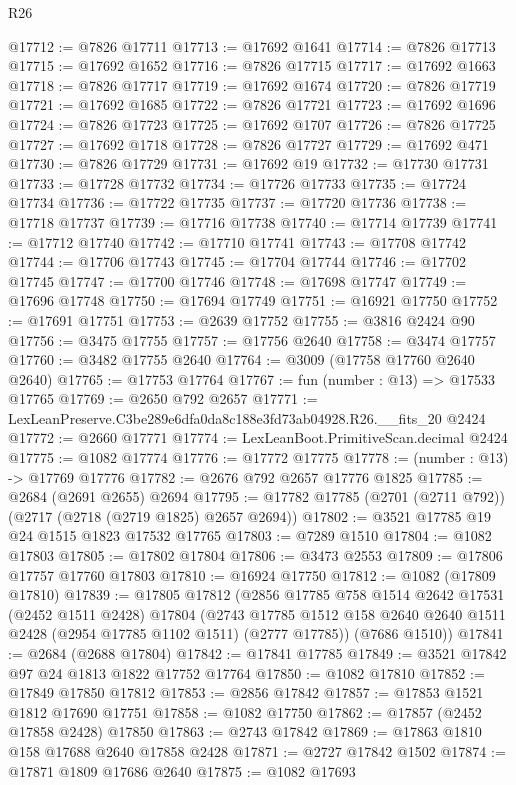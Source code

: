 \begin{lexlean}{R26}
\begin{coremodule}
@17712 := @7826 @17711
@17713 := @17692 @1641
@17714 := @7826 @17713
@17715 := @17692 @1652
@17716 := @7826 @17715
@17717 := @17692 @1663
@17718 := @7826 @17717
@17719 := @17692 @1674
@17720 := @7826 @17719
@17721 := @17692 @1685
@17722 := @7826 @17721
@17723 := @17692 @1696
@17724 := @7826 @17723
@17725 := @17692 @1707
@17726 := @7826 @17725
@17727 := @17692 @1718
@17728 := @7826 @17727
@17729 := @17692 @471
@17730 := @7826 @17729
@17731 := @17692 @19
@17732 := @17730 @17731
@17733 := @17728 @17732
@17734 := @17726 @17733
@17735 := @17724 @17734
@17736 := @17722 @17735
@17737 := @17720 @17736
@17738 := @17718 @17737
@17739 := @17716 @17738
@17740 := @17714 @17739
@17741 := @17712 @17740
@17742 := @17710 @17741
@17743 := @17708 @17742
@17744 := @17706 @17743
@17745 := @17704 @17744
@17746 := @17702 @17745
@17747 := @17700 @17746
@17748 := @17698 @17747
@17749 := @17696 @17748
@17750 := @17694 @17749
@17751 := @16921 @17750
@17752 := @17691 @17751
@17753 := @2639 @17752
@17755 := @3816 @2424 @90
@17756 := @3475 @17755
@17757 := @17756 @2640
@17758 := @3474 @17757
@17760 := @3482 @17755 @2640
@17764 := @3009 (@17758 @17760 @2640 @2640)
@17765 := @17753 @17764
@17767 := fun (number : @13) => @17533 @17765
@17769 := @2650 @792 @2657
@17771 := LexLeanPreserve.C3be289e6dfa0da8c188e3fd73ab04928.R26.__fits_20 @2424
@17772 := @2660 @17771
@17774 := LexLeanBoot.PrimitiveScan.decimal @2424
@17775 := @1082 @17774
@17776 := @17772 @17775
@17778 := (number : @13) -> @17769 @17776
@17782 := @2676 @792 @2657 @17776 @1825
@17785 := @2684 (@2691 @2655) @2694
@17795 := @17782 @17785 (@2701 (@2711 @792)) (@2717 (@2718 (@2719 @1825) @2657 @2694))
@17802 := @3521 @17785 @19 @24 @1515 @1823 @17532 @17765
@17803 := @7289 @1510
@17804 := @1082 @17803
@17805 := @17802 @17804
@17806 := @3473 @2553
@17809 := @17806 @17757 @17760 @17803
@17810 := @16924 @17750
@17812 := @1082 (@17809 @17810)
@17839 := @17805
    @17812
    (@2856
      @17785
      @758
      @1514
      @2642
      @17531
      (@2452 @1511 @2428)
      @17804
      (@2743 @17785 @1512 @158 @2640 @2640 @1511 @2428 (@2954 @17785 @1102 @1511) (@2777 @17785))
      (@7686 @1510))
@17841 := @2684 (@2688 @17804)
@17842 := @17841 @17785
@17849 := @3521 @17842 @97 @24 @1813 @1822 @17752 @17764
@17850 := @1082 @17810
@17852 := @17849 @17850 @17812
@17853 := @2856 @17842
@17857 := @17853 @1521 @1812 @17690 @17751
@17858 := @1082 @17750
@17862 := @17857 (@2452 @17858 @2428) @17850
@17863 := @2743 @17842
@17869 := @17863 @1810 @158 @17688 @2640 @17858 @2428
@17871 := @2727 @17842 @1502
@17874 := @17871 @1809 @17686 @2640
@17875 := @1082 @17693

\end{coremodule}
\end{lexlean}
